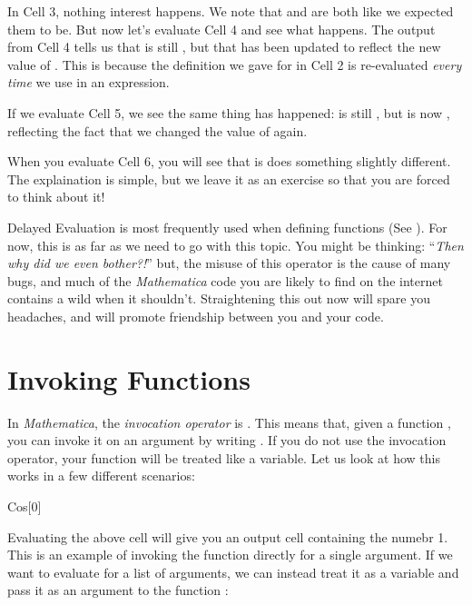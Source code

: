 In Cell 3, nothing interest happens. We note that  and  are both  like we expected them to be. But now let's evaluate Cell 4 and see what happens. The output from Cell 4 tells us that  is still , but that  has been updated to reflect the new value of . This is because the definition we gave for  in Cell 2 is re-evaluated \emph{every time} we use  in an expression.

If we evaluate Cell 5, we see the same thing has happened:  is still , but  is now , reflecting the fact that we changed the value of  again.

When you evaluate Cell 6, you will see that is does something slightly different. The explaination is simple, but we leave it as an exercise so that you are forced to think about it!

Delayed Evaluation is most frequently used when defining functions (See ). For now, this is as far as we need to go with this topic. You might be thinking: ``\emph{Then why did we even bother?!}'' but, the misuse of this operator is the cause of many bugs, and much of the \emph{Mathematica} code you are likely to find on the internet contains a wild \expr{:=} when it shouldn't. Straightening this out now will spare you headaches, and will promote friendship between you and your code.

\section{Invoking Functions}
\label{sec:InvokingFunctions}

In \emph{Mathematica}, the \emph{invocation operator} is \expr{[]}. This means that, given a function , you can invoke it on an argument  by writing . If you do not use the invocation operator, your function will be treated like a variable. Let us look at how this works in a few different scenarios:

\begin{code}
	   Cos[0]
\end{code}

Evaluating the above cell will give you an output cell containing the numebr 1. This is an example of invoking the  function directly for a single argument. If we want to evaluate  for a list of arguments, we can instead treat it as a variable and pass it as an argument to the function :

